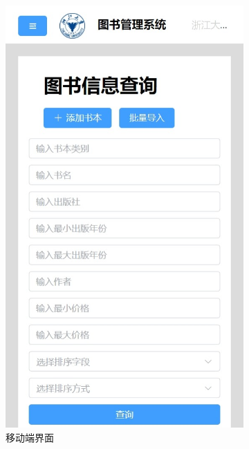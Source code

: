 \documentclass[a4paper,oneside]{ctexbook}
\begin{document}
\begin{figure}[!ht]
    \centering
    \begin{subfigure}{.2\linewidth}
        \centering
        \includegraphics[width=0.8\linewidth]{front-phone.jpeg}
        \caption{移动端界面}
        \label{fig:front-phone}
    \end{subfigure}%
    \begin{subfigure}{.2\linewidth}
        \centering

\end{subfigure}
\end{figure}
\end{document}
